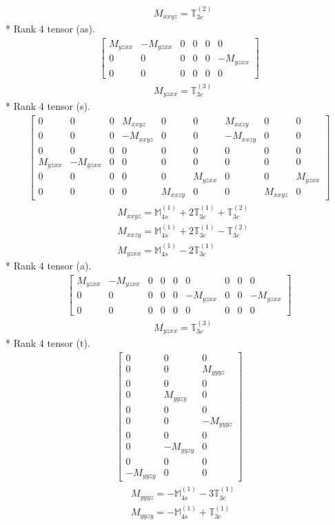 \documentclass[fleqn,8pt,landscape]{jsarticle}
\begin{document}
\begin{align*}
& M_{xxyz} = \mathbb{T}_{3c}^{(2)}
\end{align*}
* Rank 4 tensor (as).
\begin{align*}
\begin{bmatrix} M_{yzxx} & - M_{yzxx} & 0 & 0 & 0 & 0 \\ 0 & 0 & 0 & 0 & 0 & - M_{yzxx} \\ 0 & 0 & 0 & 0 & 0 & 0 \end{bmatrix}
\end{align*}
\begin{align*}
& M_{yzxx} = \mathbb{T}_{3c}^{(3)}
\end{align*}
* Rank 4 tensor (s).
\begin{align*}
\begin{bmatrix} 0 & 0 & 0 & M_{xxyz} & 0 & 0 & M_{xxzy} & 0 & 0 \\ 0 & 0 & 0 & - M_{xxyz} & 0 & 0 & - M_{xxzy} & 0 & 0 \\ 0 & 0 & 0 & 0 & 0 & 0 & 0 & 0 & 0 \\ M_{yzxx} & - M_{yzxx} & 0 & 0 & 0 & 0 & 0 & 0 & 0 \\ 0 & 0 & 0 & 0 & 0 & M_{yzxx} & 0 & 0 & M_{yzxx} \\ 0 & 0 & 0 & 0 & M_{xxzy} & 0 & 0 & M_{xxyz} & 0 \end{bmatrix}
\end{align*}
\begin{align*}
& M_{xxyz} = \mathbb{M}_{4s}^{(1)} + 2 \mathbb{T}_{3c}^{(1)} + \mathbb{T}_{3c}^{(2)} \\
& M_{xxzy} = \mathbb{M}_{4s}^{(1)} + 2 \mathbb{T}_{3c}^{(1)} - \mathbb{T}_{3c}^{(2)} \\
& M_{yzxx} = \mathbb{M}_{4s}^{(1)} - 2 \mathbb{T}_{3c}^{(1)}
\end{align*}
* Rank 4 tensor (a).
\begin{align*}
\begin{bmatrix} M_{yzxx} & - M_{yzxx} & 0 & 0 & 0 & 0 & 0 & 0 & 0 \\ 0 & 0 & 0 & 0 & 0 & - M_{yzxx} & 0 & 0 & - M_{yzxx} \\ 0 & 0 & 0 & 0 & 0 & 0 & 0 & 0 & 0 \end{bmatrix}
\end{align*}
\begin{align*}
& M_{yzxx} = \mathbb{T}_{3c}^{(3)}
\end{align*}
* Rank 4 tensor (t).
\begin{align*}
\begin{bmatrix} 0 & 0 & 0 \\ 0 & 0 & M_{yyyz} \\ 0 & 0 & 0 \\ 0 & M_{yyzy} & 0 \\ 0 & 0 & 0 \\ 0 & 0 & - M_{yyyz} \\ 0 & 0 & 0 \\ 0 & - M_{yyzy} & 0 \\ 0 & 0 & 0 \\ - M_{yyzy} & 0 & 0 \end{bmatrix}
\end{align*}
\begin{align*}
& M_{yyyz} = - \mathbb{M}_{4s}^{(1)} - 3 \mathbb{T}_{3c}^{(1)} \\
& M_{yyzy} = - \mathbb{M}_{4s}^{(1)} + \mathbb{T}_{3c}^{(1)}
\end{align*}
\end{document}
